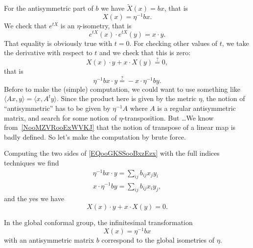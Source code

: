 \begin{description}
    For the antisymmetric part of \(b\)  we have \( \tilde X(x)=bx\), that is
    \begin{equation}
        X(x)=\eta^{-1}bx.
    \end{equation}
    We check that \(  e^{tX}\) is an \( \eta\)-isometry, that is
    \begin{equation}
        e^{tX}(x)\cdot  e^{tX}(y)=x\cdot y.
    \end{equation}
    That equality is obviously true with \( t=0\). For checking other values of \( t\), we take the derivative with respect to \( t\) and we check that this is zero:
    \begin{equation}
        X(x)\cdot y+x\cdot X(y)\stackrel{?}{=}0,
    \end{equation}
    that is
    \begin{equation}    \label{EQooGKSSooBxzEzx}
        \eta^{-1}bx\cdot y\stackrel{?}{=}-x\cdot \eta^{-1}by.
    \end{equation}
    Before to make the (simple) computation, we could want to use something like \( \langle Ax, y\rangle =\langle x, A^ty\rangle \). Since the product here is given by the metric \( \eta\), the notion of ``antisymmetric'' has to be given by \( \eta^{-1}A\) where \( A\) is a regular antisymmetric matrix, and search for some notion of \( \eta\)-transposition. But \ldots We know from~\ref{NooMZVRooExWVKJ} that the notion of transpose of a linear map is badly defined. So let's make the computation by brute force.

    Computing the two sides of \eqref{EQooGKSSooBxzEzx} with the full indices techniques we find
    \begin{subequations}
        \begin{align}
            \eta^{-1}bx\cdot y=\sum_{ij}b_{ij}x_jy_i\\
            x\cdot \eta^{-1}by=\sum_{ij}b_{ij}x_iy_j,
        \end{align}
    \end{subequations}
    and the yes we have
    \begin{equation}
        X(x)\cdot y+x\cdot X(y)=0.
    \end{equation}

    In the global conformal group, the infinitesimal transformation
    \begin{equation}
        X(x)=\eta^{-1}bx
    \end{equation}
    with an antisymmetric matrix \( b\) correspond to the global isometries of \( \eta\).


\end{description}
